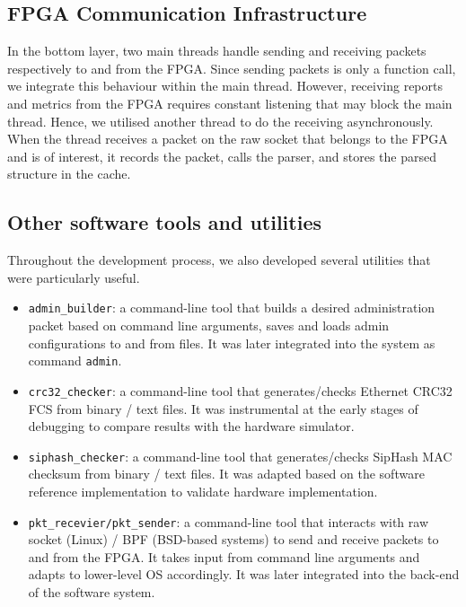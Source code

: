 \documentclass[a4paper]{report}
\newcommand{\code}{\texttt}
\begin{document}
\subsection{FPGA Communication Infrastructure}

In the bottom layer, two main threads handle sending and receiving packets respectively to and from the FPGA. Since sending packets is only a function call, we integrate this behaviour within the main thread. However, receiving reports and metrics from the FPGA requires constant listening that may block the main thread. Hence, we utilised another thread to do the receiving asynchronously. When the thread receives a packet on the raw socket that belongs to the FPGA and is of interest, it records the packet, calls the parser, and stores the parsed structure in the cache.

\subsection{Other software tools and utilities}

Throughout the development process, we also developed several utilities that were particularly useful. 

\begin{itemize}
    \item \code{admin\_builder}: a command-line tool that builds a desired administration packet based on command line arguments, saves and loads admin configurations to and from files. It was later integrated into the system as command \code{admin}.
    \item \code{crc32\_checker}: a command-line tool that generates/checks Ethernet CRC32 FCS from binary / text files. It was instrumental at the early stages of debugging to compare results with the hardware simulator.
    \item \code{siphash\_checker}: a command-line tool that generates/checks SipHash MAC checksum from binary / text files. It was adapted based on the software reference implementation \cite{aumasson-bernstein-2012} to validate hardware implementation.
    \item \code{pkt\_recevier/pkt\_sender}: a command-line tool that interacts with raw socket (Linux) / BPF (BSD-based systems) to send and receive packets to and from the FPGA. It takes input from command line arguments and adapts to lower-level OS accordingly. It was later integrated into the back-end of the software system.
\end{itemize}
\end{document}
